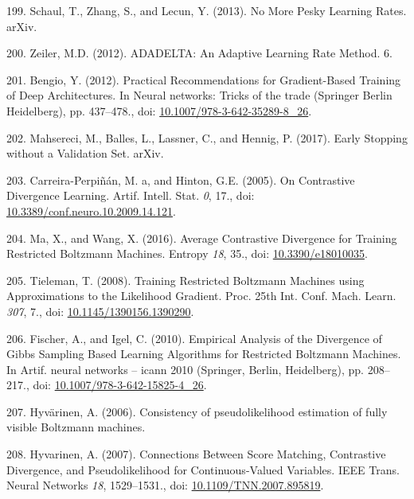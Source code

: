 \documentclass[11pt,a4paper,twoside]{book}
\theoremstyle{definition}
\theoremstyle{definition}
\theoremstyle{remark}
\begin{document}
\hypertarget{ref-Schaul2013}{}
199. Schaul, T., Zhang, S., and Lecun, Y. (2013). No More Pesky Learning
Rates. arXiv.

\hypertarget{ref-Zeiler2012}{}
200. Zeiler, M.D. (2012). ADADELTA: An Adaptive Learning Rate Method. 6.

\hypertarget{ref-Bengio2012}{}
201. Bengio, Y. (2012). Practical Recommendations for Gradient-Based
Training of Deep Architectures. In Neural networks: Tricks of the trade
(Springer Berlin Heidelberg), pp. 437--478., doi:
\href{https://doi.org/10.1007/978-3-642-35289-8_26}{10.1007/978-3-642-35289-8\_26}.

\hypertarget{ref-Mahsereci2017}{}
202. Mahsereci, M., Balles, L., Lassner, C., and Hennig, P. (2017).
Early Stopping without a Validation Set. arXiv.

\hypertarget{ref-Carreira-Perpinan2005}{}
203. Carreira-Perpiñán, M. a, and Hinton, G.E. (2005). On Contrastive
Divergence Learning. Artif. Intell. Stat. \emph{0}, 17., doi:
\href{https://doi.org/10.3389/conf.neuro.10.2009.14.121}{10.3389/conf.neuro.10.2009.14.121}.

\hypertarget{ref-Ma2016}{}
204. Ma, X., and Wang, X. (2016). Average Contrastive Divergence for
Training Restricted Boltzmann Machines. Entropy \emph{18}, 35., doi:
\href{https://doi.org/10.3390/e18010035}{10.3390/e18010035}.

\hypertarget{ref-Tieleman2008}{}
205. Tieleman, T. (2008). Training Restricted Boltzmann Machines using
Approximations to the Likelihood Gradient. Proc. 25th Int. Conf. Mach.
Learn. \emph{307}, 7., doi:
\href{https://doi.org/10.1145/1390156.1390290}{10.1145/1390156.1390290}.

\hypertarget{ref-Fischer2010}{}
206. Fischer, A., and Igel, C. (2010). Empirical Analysis of the
Divergence of Gibbs Sampling Based Learning Algorithms for Restricted
Boltzmann Machines. In Artif. neural networks -- icann 2010 (Springer,
Berlin, Heidelberg), pp. 208--217., doi:
\href{https://doi.org/10.1007/978-3-642-15825-4_26}{10.1007/978-3-642-15825-4\_26}.

\hypertarget{ref-Hyvarinen2006}{}
207. Hyvärinen, A. (2006). Consistency of pseudolikelihood estimation of
fully visible Boltzmann machines.

\hypertarget{ref-Hyvarinen2007}{}
208. Hyvarinen, A. (2007). Connections Between Score Matching,
Contrastive Divergence, and Pseudolikelihood for Continuous-Valued
Variables. IEEE Trans. Neural Networks \emph{18}, 1529--1531., doi:
\href{https://doi.org/10.1109/TNN.2007.895819}{10.1109/TNN.2007.895819}.
\end{document}
